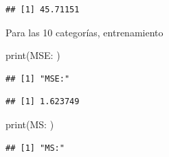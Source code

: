 \documentclass[
]{article}
\newenvironment{Shaded}{\begin{snugshade}}{\end{snugshade}}
\newcommand{\DecValTok}[1]{\textcolor[rgb]{0.00,0.00,0.81}{#1}}
\newcommand{\FunctionTok}[1]{\textcolor[rgb]{0.00,0.00,0.00}{#1}}
\newcommand{\NormalTok}[1]{#1}
\newcommand{\OtherTok}[1]{\textcolor[rgb]{0.56,0.35,0.01}{#1}}
\newcommand{\SpecialCharTok}[1]{\textcolor[rgb]{0.00,0.00,0.00}{#1}}
\newcommand{\StringTok}[1]{\textcolor[rgb]{0.31,0.60,0.02}{#1}}
\begin{document}
\begin{Shaded}
\end{Shaded}

\begin{verbatim}
## [1] 45.71151
\end{verbatim}

Para las 10 categorías, entrenamiento

\begin{Shaded}
\begin{Highlighting}[]
\FunctionTok{print}\NormalTok{(}\StringTok{\textquotesingle{}MSE:\textquotesingle{}}\NormalTok{ )}
\end{Highlighting}
\end{Shaded}

\begin{verbatim}
## [1] "MSE:"
\end{verbatim}

\begin{Shaded}
\end{Shaded}

\begin{verbatim}
## [1] 1.623749
\end{verbatim}

\begin{Shaded}
\begin{Highlighting}[]
\FunctionTok{print}\NormalTok{(}\StringTok{\textquotesingle{}MS:\textquotesingle{}}\NormalTok{ )}
\end{Highlighting}
\end{Shaded}

\begin{verbatim}
## [1] "MS:"
\end{verbatim}
\end{document}
